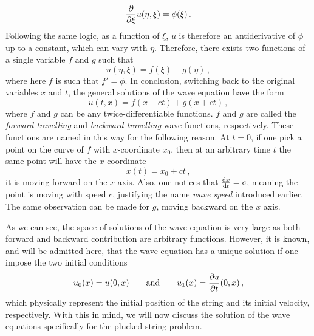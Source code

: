 \begin{equation}
  \frac{\partial }{\partial \xi}u(\eta,\xi)=\phi(\xi)\,.
\end{equation}
Following the same logic, as a function of $\xi$, $u$ is therefore an antiderivative of
$\phi$ up to a constant, which can vary with $\eta$. Therefore, there exists two functions
of a single variable $f$ and $g$ such that
\begin{equation}
  u(\eta,\xi)=f(\xi)+g(\eta)\,,
\end{equation}
where here $f$ is such that $f'=\phi$. In conclusion, switching back to the original
variables $x$ and $t$, the general solutions of the wave equation have the form
\begin{equation}
  \boxed{u(t,x)=f(x-ct)+g(x+ct)\,,}\label{eq:wave-eq-sol}
\end{equation}
where $f$ and $g$ can be any twice-differentiable functions. $f$ and $g$ are called the
\emph{forward-travelling} and \emph{backward-travelling} wave functions, respectively. These
functions are named in this way for the following reason. At $t=0$, if one pick a point on
the curve of $f$ with $x$-coordinate $x_0$, then at an arbitrary time $t$ the same point
will have the $x$-coordinate
\begin{equation}
  x(t)=x_0+ct\,,
\end{equation}
\ie it is moving forward on the $x$ axis. Also, one notices that $\frac{\mathrm{d} x}{\mathrm{d} t}=c$, meaning
the point is moving with speed $c$, justifying the name \emph{wave speed} introduced
earlier. The same observation can be made for $g$, moving backward on the $x$ axis.

As we can see, the space of solutions of the wave equation is very large as both forward
and backward contribution are arbitrary functions. However, it is known, and will be
admitted here, that the wave equation has a unique solution if one impose the two initial
conditions
\begin{equation}
  u_0(x)=u(0,x)\qquad\text{and}\qquad u_1(x)=\frac{\partial u}{\partial t}(0,x)\,,\label{eq:wave-eq-ic}
\end{equation}
which physically represent the initial position of the string and its initial velocity,
respectively. With this in mind, we will now discuss the solution of the wave equations
specifically for the plucked string problem.
%
